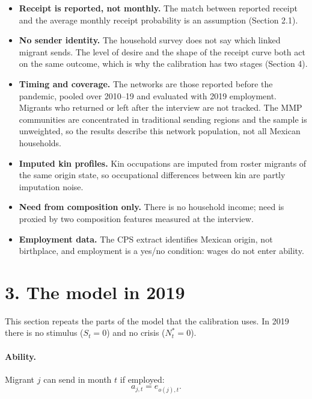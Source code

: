 \documentclass[11pt]{article}
\begin{document}
\begin{itemize}[leftmargin=*]
\item \textbf{Receipt is reported, not monthly.} The match between reported receipt and the average monthly receipt probability is an assumption (Section 2.1).
\item \textbf{No sender identity.} The household survey does not say which linked migrant sends. The level of desire and the shape of the receipt curve both act on the same outcome, which is why the calibration has two stages (Section 4).
\item \textbf{Timing and coverage.} The networks are those reported before the pandemic, pooled over 2010--19 and evaluated with 2019 employment. Migrants who returned or left after the interview are not tracked. The MMP communities are concentrated in traditional sending regions and the sample is unweighted, so the results describe this network population, not all Mexican households.
\item \textbf{Imputed kin profiles.} Kin occupations are imputed from roster migrants of the same origin state, so occupational differences between kin are partly imputation noise.
\item \textbf{Need from composition only.} There is no household income; need is proxied by two composition features measured at the interview.
\item \textbf{Employment data.} The CPS extract identifies Mexican origin, not birthplace, and employment is a yes/no condition: wages do not enter ability.
\end{itemize}

\section*{3. The model in 2019}

This section repeats the parts of the model that the calibration uses. In 2019 there is no stimulus ($S_t = 0$) and no crisis ($N^*_t = 0$).

\paragraph{Ability.} Migrant $j$ can send in month $t$ if employed:
\begin{equation}
a_{j,t} = e_{o(j),t}.
\end{equation}
\end{document}
